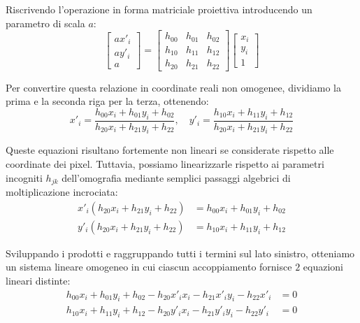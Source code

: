 ﻿\documentclass[11pt, a4paper]{article}
\begin{document}
Riscrivendo l'operazione in forma matriciale proiettiva introducendo un parametro di scala $a$:
\[
\begin{bmatrix}
ax'_i \\
ay'_i \\
a
\end{bmatrix}
=
\begin{bmatrix}
h_{00} & h_{01} & h_{02} \\
h_{10} & h_{11} & h_{12} \\
h_{20} & h_{21} & h_{22}
\end{bmatrix}
\begin{bmatrix}
x_i \\
y_i \\
1
\end{bmatrix}
\]

Per convertire questa relazione in coordinate reali non omogenee, dividiamo la prima e la seconda riga per la terza, ottenendo:
\[
x'_i = \frac{h_{00}x_i + h_{01}y_i + h_{02}}{h_{20}x_i + h_{21}y_i + h_{22}}, \quad y'_i = \frac{h_{10}x_i + h_{11}y_i + h_{12}}{h_{20}x_i + h_{21}y_i + h_{22}}
\]

Queste equazioni risultano fortemente non lineari se considerate rispetto alle coordinate dei pixel. Tuttavia, possiamo linearizzarle rispetto ai parametri incogniti $h_{jk}$ dell'omografia mediante semplici passaggi algebrici di moltiplicazione incrociata:
\begin{align*}
x'_i \left(h_{20}x_i + h_{21}y_i + h_{22}\right) &= h_{00}x_i + h_{01}y_i + h_{02} \\
y'_i \left(h_{20}x_i + h_{21}y_i + h_{22}\right) &= h_{10}x_i + h_{11}y_i + h_{12}
\end{align*}

Sviluppando i prodotti e raggruppando tutti i termini sul lato sinistro, otteniamo un sistema lineare omogeneo in cui ciascun accoppiamento fornisce $2$ equazioni lineari distinte:
\begin{align*}
h_{00}x_i + h_{01}y_i + h_{02} - h_{20}x'_i x_i - h_{21}x'_i y_i - h_{22}x'_i &= 0 \\
h_{10}x_i + h_{11}y_i + h_{12} - h_{20}y'_i x_i - h_{21}y'_i y_i - h_{22}y'_i &= 0
\end{align*}
\end{document}
